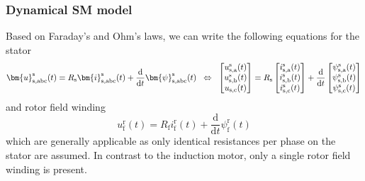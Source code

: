 \begin{frame}
	\frametitle{Dynamical SM model}
    Based on Faraday's and Ohm's laws, we can write the following equations for the stator 
    \begin{equation}
            \bm{u}^\mathrm{s}_\mathrm{s,abc}(t) = R_\mathrm{s}\bm{i}^\mathrm{s}_\mathrm{s,abc}(t)+\frac{\mathrm{d}}{\mathrm{d}t}\bm{\psi}^\mathrm{s}_\mathrm{s,abc}(t) \hspace{0.2cm} \Leftrightarrow \hspace{0.2cm} \begin{bmatrix}
                u_{\mathrm{s,a}}^\mathrm{s}(t)\\
                u_{\mathrm{s,b}}^\mathrm{s}(t)\\
                u_{\mathrm{s,c}}(t)\\
            \end{bmatrix} = R_\mathrm{s} \begin{bmatrix}
                i_{\mathrm{s,a}}^\mathrm{s}(t)\\
                i_{\mathrm{s,b}}^\mathrm{s}(t)\\
                i_{\mathrm{s,c}}^\mathrm{s}(t)\\
            \end{bmatrix} + \frac{\mathrm{d}}{\mathrm{d}t} \begin{bmatrix}
                \psi_{\mathrm{s,a}}^\mathrm{s}(t)\\
                \psi_{\mathrm{s,b}}^\mathrm{s}(t)\\
                \psi_{\mathrm{s,c}}^\mathrm{s}(t)\\
            \end{bmatrix}
            \label{eq:SM_stator_three_phase_voltage_equation}
    \end{equation}
    \pause
    and rotor field winding
    \begin{equation}
            u^\mathrm{r}_\mathrm{f}(t) = R_\mathrm{f}i^\mathrm{r}_\mathrm{f}(t)+\frac{\mathrm{d}}{\mathrm{d}t}\psi^\mathrm{r}_\mathrm{f}(t) 
            \label{eq:SM_rotor_voltage_equation}
    \end{equation}
which are generally applicable as only identical resistances per phase on the stator are assumed. \pause In contrast to the induction motor, only a single rotor field winding is present.
\end{frame}

